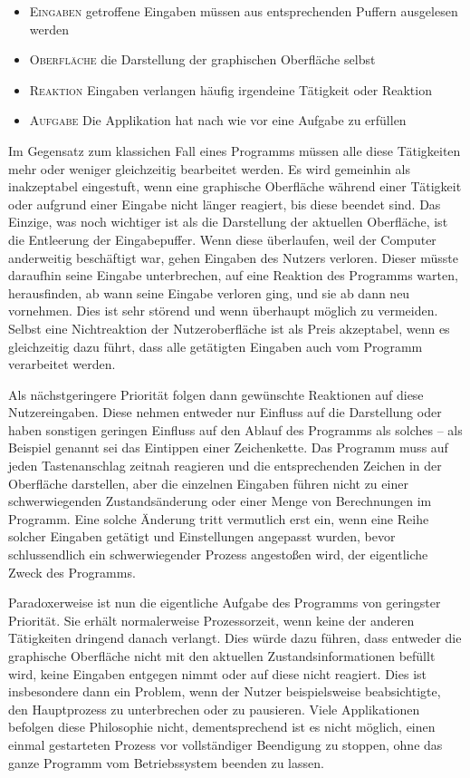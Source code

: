 \begin{itemize}
  \item \textsc{Eingaben} getroffene Eingaben müssen aus entsprechenden Puffern ausgelesen werden
  \item \textsc{Oberfläche} die Darstellung der graphischen Oberfläche selbst
  \item \textsc{Reaktion} Eingaben verlangen häufig irgendeine Tätigkeit oder Reaktion
  \item \textsc{Aufgabe} Die Applikation hat nach wie vor eine Aufgabe zu erfüllen
\end{itemize}

Im Gegensatz zum klassichen Fall eines Programms müssen alle diese Tätigkeiten
mehr oder weniger gleichzeitig bearbeitet werden. Es wird gemeinhin als inakzeptabel
eingestuft, wenn eine graphische Oberfläche während einer Tätigkeit oder aufgrund
einer Eingabe nicht länger reagiert, bis diese beendet sind. Das Einzige, was
noch wichtiger ist als die Darstellung der aktuellen Oberfläche, ist die Entleerung
der Eingabepuffer. Wenn diese überlaufen, weil der Computer anderweitig beschäftigt
war, gehen Eingaben des Nutzers verloren. Dieser müsste daraufhin seine Eingabe
unterbrechen, auf eine Reaktion des Programms warten, herausfinden, ab wann seine
Eingabe verloren ging, und sie ab dann neu vornehmen. Dies ist sehr störend
und wenn überhaupt möglich zu vermeiden. Selbst eine Nichtreaktion der Nutzeroberfläche
ist als Preis akzeptabel, wenn es gleichzeitig dazu führt, dass alle getätigten
Eingaben auch vom Programm verarbeitet werden.

Als nächstgeringere Priorität folgen dann gewünschte Reaktionen auf diese Nutzereingaben.
Diese nehmen entweder nur Einfluss auf die Darstellung oder haben sonstigen
geringen Einfluss auf den Ablauf des Programms als solches -- als Beispiel genannt
sei das Eintippen einer Zeichenkette. Das Programm muss auf jeden Tastenanschlag
zeitnah reagieren und die entsprechenden Zeichen in der Oberfläche darstellen,
aber die einzelnen Eingaben führen nicht zu einer schwerwiegenden Zustandsänderung
oder einer Menge von Berechnungen im Programm. Eine solche Änderung tritt vermutlich 
erst ein, wenn eine Reihe solcher Eingaben getätigt und Einstellungen angepasst wurden, 
bevor schlussendlich ein \glqq{}schwerwiegender\grqq{} Prozess angestoßen wird,
der eigentliche Zweck des Programms.

Paradoxerweise ist nun die eigentliche Aufgabe des Programms von geringster Priorität. 
Sie erhält normalerweise Prozessorzeit, wenn keine der anderen Tätigkeiten dringend 
danach verlangt. Dies würde dazu führen, dass entweder die graphische Oberfläche
nicht mit den aktuellen Zustandsinformationen befüllt wird, keine Eingaben entgegen
nimmt oder auf diese nicht reagiert. Dies ist insbesondere dann ein Problem, wenn der
Nutzer beispielsweise beabsichtigte, den Hauptprozess zu unterbrechen oder zu pausieren.
Viele Applikationen befolgen diese Philosophie nicht, dementsprechend ist es nicht
möglich, einen einmal gestarteten Prozess vor vollständiger Beendigung zu stoppen,
ohne das ganze Programm vom Betriebssystem beenden zu lassen.

